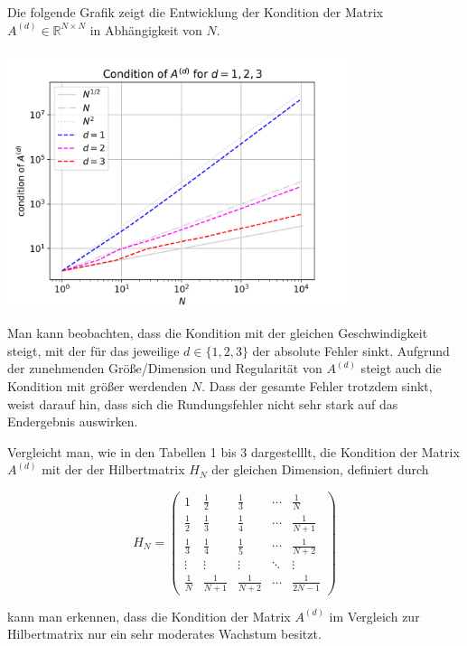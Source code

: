 \documentclass{scrartcl}
\begin{document}
Die folgende Grafik zeigt die Entwicklung der Kondition der Matrix $A^{(d)}\in\mathbb{R}^{N \times N}$ in Abhängigkeit von $N$.

{
  \centering
    \includegraphics[width=0.75\textwidth]{Grafiken/loglogcond_d123_neu}
    \vspace{-0.2cm}
}
\vspace{0.5cm}

Man kann beobachten, dass die Kondition mit der gleichen Geschwindigkeit steigt, mit der für das jeweilige $d \in \{ 1, 2, 3\}$ der absolute Fehler sinkt.
Aufgrund der zunehmenden Größe/Dimension und Regularität von $A^{(d)}$ steigt auch die Kondition mit größer werdenden $N$.
Dass der gesamte Fehler trotzdem sinkt, weist darauf hin, dass sich die Rundungsfehler nicht sehr stark auf das Endergebnis auswirken.

Vergleicht man, wie in den Tabellen 1 bis 3 dargestelllt, die Kondition der Matrix $A^{(d)}$ mit der der Hilbertmatrix $H_N$ der gleichen Dimension, definiert durch

\[H_N =
\begin{pmatrix}
  1 & \frac{1}{2} & \frac{1}{3} & \cdots & \frac{1}{N} \\
  \frac{1}{2} & \frac{1}{3} & \frac{1}{4} & \cdots & \frac{1}{N+1} \\
  \frac{1}{3} & \frac{1}{4} & \frac{1}{5} & \cdots & \frac{1}{N+2} \\
  \vdots & \vdots & \vdots & \ddots & \vdots \\
  \frac{1}{N} & \frac{1}{N+1} & \frac{1}{N+2} & \cdots & \frac{1}{2N-1}
\end{pmatrix}\]\cite{tischendorf2019}

kann man erkennen, dass die Kondition der Matrix $A^{(d)}$ im Vergleich zur Hilbertmatrix nur ein sehr moderates Wachstum besitzt.
\end{document}
